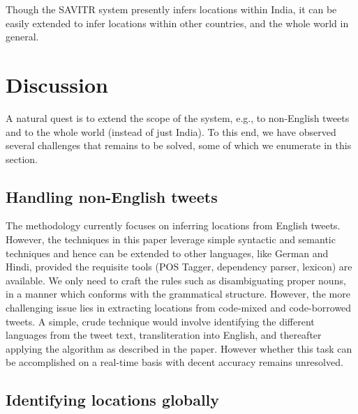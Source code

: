 Though the SAVITR system presently infers locations within India, it can be easily extended to infer locations within other countries, and the whole world in general. 





\section{Discussion}

A natural quest is to extend the scope of the system, e.g., to non-English tweets and to the whole world (instead of just India). 
To this end, we have observed several challenges that remains to be solved, some of which we enumerate in this section.

\subsection{Handling non-English tweets}

The methodology currently focuses on inferring locations from English tweets. However, the techniques in this paper leverage simple syntactic and semantic techniques and hence can be extended to other languages, like German and Hindi, provided the requisite tools (POS Tagger, dependency parser, lexicon) are available. We only need to craft the rules such as disambiguating proper nouns, in a manner which conforms with the grammatical structure.
However, the more challenging issue lies in extracting locations from code-mixed and code-borrowed tweets. A simple, crude technique would involve identifying the different languages from the tweet text, transliteration into English, and thereafter applying the algorithm as described in the paper. However whether this task can be accomplished on a real-time basis with decent accuracy remains unresolved.

\subsection{Identifying locations globally}

